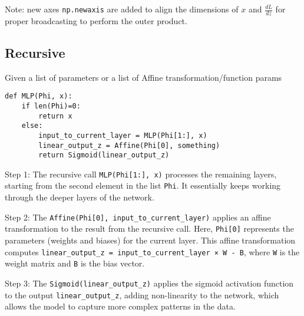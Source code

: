 \documentclass{article}
\begin{document}
Note: new axes \verb|np.newaxis| are added to align the dimensions of $x$ and $\frac{dL}{dz}$ for proper broadcasting to perform the outer product. 

\subsection{Recursive}
Given a list of parameters or a list of Affine transformation/function params
\begin{verbatim}
def MLP(Phi, x):
    if len(Phi)=0:
        return x
    else:
        input_to_current_layer = MLP(Phi[1:], x)
        linear_output_z = Affine(Phi[0], something) 
        return Sigmoid(linear_output_z)
\end{verbatim}
Step 1: The recursive call \verb|MLP(Phi[1:], x)| processes the remaining layers, starting from the second element in the list \verb|Phi|. It essentially keeps working through the deeper layers of the network.

Step 2: The \verb|Affine(Phi[0], input_to_current_layer)| applies an affine transformation to the result from the recursive call. Here, \verb|Phi[0]| represents the parameters (weights and biases) for the current layer. This affine transformation computes \verb|linear_output_z = input_to_current_layer × W - B|, where \verb|W| is the weight matrix and \verb|B| is the bias vector.

Step 3: The \verb|Sigmoid(linear_output_z)| applies the sigmoid activation function to the output \verb|linear_output_z|, adding non-linearity to the network, which allows the model to capture more complex patterns in the data.

 
\end{document}
